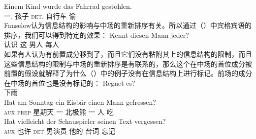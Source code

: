 \ex
\gll Einem Kind wurde das Fahrrad gestohlen.\\
     一.\dat{} 孩子 \passivepst{} \textsc{det}.\nom{} 自行车 偷\\
\zl
Fanselow认为信息结构的影响与中场的重新排序有关。所以通过（）中宾格宾语的排序，我们可以得到特定的效果：
\ea
\gll Kennt diesen Mann jeder?\\
     认识 这 男人 每人\\
\z
如果有人认为有前置成分移到了\vfc，而且它们没有粘附其上的信息结构的限制，而且这些信息结构的限制与中场的重新排序是有联系的，那么这个在中场的首位成分被前置的假设就解释了为什么（）中的例子没有在信息结构上进行标记。前场的成分在中场的首位也是没有标记的：
\eal
\ex
\gll Regnet es?\\
     下雨 \expl\\
\ex 
\gll Hat am Sonntag ein Eisbär einen Mann gefressen?\\
     \textsc{aux} \textsc{prep} 星期天  一   北极熊 一 人 吃\\
\ex 
\gll Hat vielleicht der Schauspieler seinen Text vergessen?\\
     \textsc{aux} 也许    \textsc{det} 男演员 他的 台词 忘记\\

